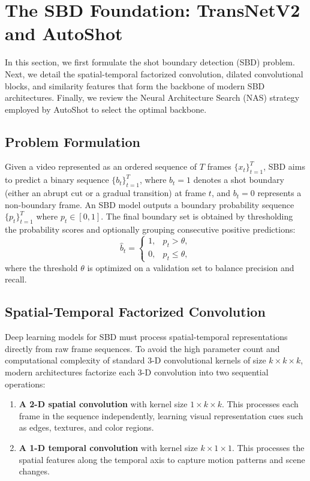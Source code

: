 \section{The SBD Foundation: TransNetV2 and AutoShot}

In this section, we first formulate the shot boundary detection (SBD) problem. Next, we detail the spatial-temporal factorized convolution, dilated convolutional blocks, and similarity features that form the backbone of modern SBD architectures. Finally, we review the Neural Architecture Search (NAS) strategy employed by AutoShot to select the optimal backbone.

\subsection{Problem Formulation}

Given a video represented as an ordered sequence of $T$ frames $\{x_t\}_{t=1}^{T}$, SBD aims to predict a binary sequence $\{b_t\}_{t=1}^{T}$, where $b_t=1$ denotes a shot boundary (either an abrupt cut or a gradual transition) at frame $t$, and $b_t=0$ represents a non-boundary frame. An SBD model outputs a boundary probability sequence $\{p_t\}_{t=1}^{T}$ where $p_t \in [0,1]$. The final boundary set is obtained by thresholding the probability scores and optionally grouping consecutive positive predictions:
\begin{equation}
    \hat{b}_t =
    \begin{cases}
        1, & p_t > \theta,\\
        0, & p_t \leq \theta,
    \end{cases}
\end{equation}
where the threshold $\theta$ is optimized on a validation set to balance precision and recall.

\subsection{Spatial-Temporal Factorized Convolution}

Deep learning models for SBD must process spatial-temporal representations directly from raw frame sequences. To avoid the high parameter count and computational complexity of standard 3-D convolutional kernels of size $k \times k \times k$, modern architectures factorize each 3-D convolution into two sequential operations:
\begin{enumerate}
    \item \textbf{A 2-D spatial convolution} with kernel size $1 \times k \times k$. This processes each frame in the sequence independently, learning visual representation cues such as edges, textures, and color regions.
    \item \textbf{A 1-D temporal convolution} with kernel size $k \times 1 \times 1$. This processes the spatial features along the temporal axis to capture motion patterns and scene changes.
\end{enumerate}

